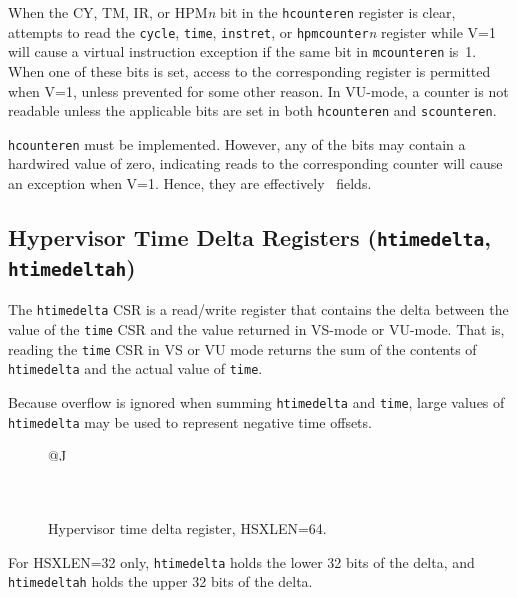 When the CY, TM, IR, or HPM{\em n} bit in the {\tt hcounteren} register
is clear, attempts to read the {\tt cycle}, {\tt time}, {\tt instret}, or
{\tt hpmcounter}{\em n} register while V=1 will cause a virtual
instruction exception if the same bit in {\tt mcounteren} is~1.
When one of these bits is set, access to the corresponding register is
permitted when V=1, unless prevented for some other reason.
In VU-mode, a counter is not readable unless the applicable bits are set
in both {\tt hcounteren} and {\tt scounteren}.

{\tt hcounteren} must be implemented.
However, any of the bits may contain a hardwired value of zero,
indicating reads to the corresponding counter will cause an exception
when V=1.
Hence, they are effectively \warl\ fields.

\subsection{Hypervisor Time Delta Registers ({\tt htimedelta}, {\tt htimedeltah})}

The {\tt htimedelta} CSR is a read/write register that contains the delta
between the value of the {\tt time} CSR and the value returned in VS-mode or
VU-mode.
That is, reading the {\tt time} CSR in VS or VU mode returns the sum of the
contents of {\tt htimedelta} and the actual value of {\tt time}.

\begin{commentary}
Because overflow is ignored when summing {\tt htimedelta} and {\tt time},
large values of {\tt htimedelta} may be used to represent negative time
offsets.
\end{commentary}

\begin{figure*}[h!]
{\footnotesize
\begin{center}
\begin{tabular}{@{}J}
 \\
\hline
{} \\
 \\
\end{tabular}
\end{center}
}
\vspace{-0.1in}
\caption{Hypervisor time delta register, HSXLEN=64.}
\label{hdeltareg}
\end{figure*}

For HSXLEN=32 only, {\tt htimedelta} holds the lower 32 bits of the
delta, and {\tt htimedeltah} holds the upper 32 bits of the delta.

